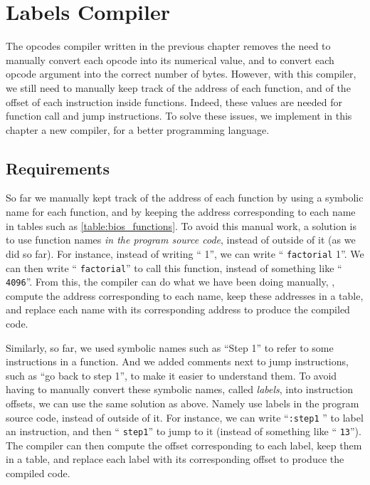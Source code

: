 
\renewcommand{\rustfile}{chapter4}
\setcounter{rustid}{0}


\chapter{Labels Compiler}\label{chapter:labels-compiler}

The opcodes compiler written in the previous chapter removes the need to
manually convert each opcode into its numerical value, and to convert each
opcode argument into the correct number of bytes. However, with this compiler,
we still need to manually keep track of the address of each function, and of
the offset of each instruction inside functions. Indeed, these values are
needed for function call and jump instructions. To solve these issues, we
implement in this chapter a new compiler, for a better programming language.

\section{Requirements}\label{section:toyc1-requirements}

So far we manually kept track of the address of each function by using a
symbolic name for each function, and by keeping the address corresponding to
each name in tables such as \cref{table:bios_functions}. To avoid this manual
work, a solution is to use function names {\em in the program source code},
instead of outside of it (as we did so far). For instance, instead of writing
`` 1'', we can write `` {\tt factorial} 1''. We can then
write `` {\tt factorial}'' to call this function, instead of
something like `` {\tt 4096}''. From this, the compiler can do what
we have been doing manually, \ie, compute the address corresponding to each
name, keep these addresses in a table, and replace each name with its
corresponding address to produce the compiled code.

Similarly, so far, we used symbolic names such as ``Step 1'' to refer to some
instructions in a function. And we added comments next to jump instructions,
such as ``go back to step 1'', to make it easier to understand them. To avoid
having to manually convert these symbolic names, called {\em labels}, into
instruction offsets, we can use the same solution as above. Namely use labels
in the program source code, instead of outside of it. For instance, we can
write ``{\tt :step1} '' to label an instruction, and then
`` {\tt step1}'' to jump to it (instead of something like
`` {\tt 13}''). The compiler can then compute the offset
corresponding to each label, keep them in a table, and replace each label with
its corresponding offset to produce the compiled code.

